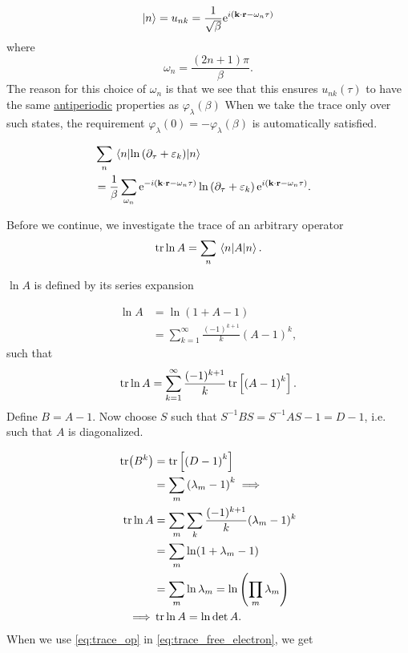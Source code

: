 \begin{equation}
\ket n = u_{nk} = \frac{1}{\sqrt{\beta}}\mathrm{e}^{i\left(\textbf{k}\cdot\textbf{r} - \omega_n\tau \right)}
\end{equation}
where
\begin{equation}
\omega_n = \frac{\left(2n+1\right)\pi}{\beta}.
\end{equation}
The reason for this choice of $\omega_n$ is that we see that this ensures $u_{nk}(\tau)$ to have the same \underline{antiperiodic} properties as $\varphi_\lambda(\beta)$
When we take the trace only over such states, the requirement \( \varphi_\lambda(0) = -\varphi_\lambda(\beta)\) is automatically satisfied.

\begin{align}
&\sum_n \ev{\ln\left(\partial_\tau + \varepsilon_k\right)}{n} & \nonumber \\
& = \frac{1}{\beta}\sum_{\omega_n}\e^{-i\left(\textbf{k}\cdot \textbf{r} - \omega_n\tau\right)}\ln\left(\partial_\tau + \varepsilon_k\right)\e^{i\left(\textbf{k}\cdot \textbf{r} - \omega_n\tau\right)}. \label{eq:trace_free_electron}&
\end{align}

Before we continue, we investigate the trace of an arbitrary operator
\begin{equation}
\tr\ln A = \sum_n\ev{A}{n}.
\end{equation}

$\ln A$ is defined by its series expansion

\begin{align}
\ln A &= \ln (1+A-1) \nonumber \\
&= \sum_{k=1}^\infty\frac{(-1)^{k+1}}{k}\left(A-1\right)^k,
\end{align}
such that 
\begin{equation}
\tr\ln A = \sum_{k=1}^\infty\frac{(-1)^{k+1}}{k}\tr\left[\left(A-1\right)^k\right].
\end{equation}
Define $B = A-1$. Now choose $S$ such that $S^{-1}BS = S^{-1}AS -1 = D-1$, i.e. such that $A$ is diagonalized. 

\begin{align}
\tr(B^k) &= \tr\left[\left(D-1\right)^k\right] \nonumber\\
&= \sum_m \left(\lambda_m -1\right)^k
\implies\nonumber \\
\tr\ln A &= \sum_m\sum_k\frac{(-1)^{k+1}}{k}(\lambda_m-1)^k\nonumber \\
&= \sum_m\ln(1+\lambda_m -1)\nonumber \\
&= \sum_m \ln\lambda_m = \ln \left(\prod_m\lambda_m\right)\nonumber \\
\implies & \tr\ln A = \ln\det A. \label{eq:trace_op}
\end{align}
When we use \eqref{eq:trace_op} in \eqref{eq:trace_free_electron}, we get

